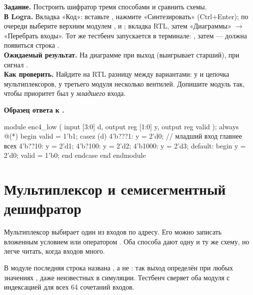 
\begin{diybox}
\textbf{Задание.} Построить шифратор тремя способами и сравнить схемы.\\
\textbf{В Logra.} Вкладка «Код»: вставьте , нажмите «Синтезировать»
(Ctrl+Enter); по очереди выберите верхним модулем ,
 и ; вкладка RTL, затем «Диаграммы»
$\to$ «Перебрать входы». Тот же тестбенч запускается в терминале:
, затем  --- должна
появиться строка .\\
\textbf{Ожидаемый результат.} На диаграмме при  выход 
(выигрывает старший), при  сигнал .\\
\textbf{Как проверить.} Найдите на RTL разницу между вариантами: у 
и  цепочка мультиплексоров, у третьего модуля несколько вентилей.
 Допишите модуль так, чтобы приоритет был у \emph{младшего} входа.
\end{diybox}

\textbf{Образец ответа к .}\par\nopagebreak
\begin{vcode}
module enc4_low (
    input      [3:0] d,
    output reg [1:0] y,
    output reg       valid
);
    always @(*) begin
        valid = 1'b1;
        casez (d)
            4'b???1: y = 2'd0;      // младший вход главнее всех
            4'b??10: y = 2'd1;
            4'b?100: y = 2'd2;
            4'b1000: y = 2'd3;
            default: begin y = 2'd0; valid = 1'b0; end
        endcase
    end
endmodule
\end{vcode}


\section{Мультиплексор и семисегментный дешифратор}
\label{sec:v-mux-seg}

Мультиплексор выбирает один из входов по адресу. Его можно записать
вложенным условием  или оператором . Оба способа дают одну
и ту же схему, но  легче читать, когда входов много.


В модуле  последняя строка названа , а не
: так выход определён при любых значениях , даже
неизвестных  в симуляции. Тестбенч  сверяет оба модуля
с индексацией  для всех 64 сочетаний входов.

